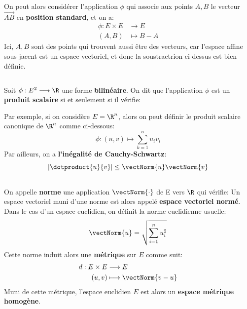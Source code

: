 On peut alors considérer l'application \(\phi\) qui associe aux points \(A, B\) le vecteur \(\overrightarrow{AB}\) en \textbf{position standard}, et on a:
\[
   \begin{aligned}
      \phi: E \times E &\longrightarrow E\\
      (A, B) &\longmapsto B - A
   \end{aligned}
\]
Ici, \(A, B\) sont des points qui trouvent aussi être des vecteurs, car l'espace affine sous-jacent est un espace vectoriel, et donc la soustractrion ci-dessus est bien définie.


\subsection*{}
Soit \(\phi : E^2 \longrightarrow \R\) une forme \textbf{bilinéaire}. On dit que l'application \(\phi\) est un \textbf{produit scalaire} si et seulement si il vérifie:


Par exemple, si on considère \(E = \R^n\), alors on peut définir le produit scalaire canonique de \(\R^n\) comme ci-dessous:
\[
   \phi : (u, v) \longmapsto \sum_{k=1}^{n} u_iv_i 
\]
Par ailleurs, on a \textbf{l'inégalité de Cauchy-Schwartz}:
\[
    |\dotproduct{u}{v}| \leq \vectNorm{u} \vectNorm{v}
\]

\subsection*{}
On appelle \textbf{norme} une application \(\vectNorm{\cdot}\) de E vers \(\R\) qui vérifie:
Un espace vectoriel muni d'une norme est alors appelé \textbf{espace vectoriel normé}. Dans le cas d'un espace euclidien, on définit la norme euclidienne usuelle:
\[
   \vectNorm{u} = \sqrt{\sum_{i=1}^n u_i^2}
\]
Cette norme induit alors une \textbf{métrique} sur \(E\)  comme suit:
\[
   \begin{aligned}
      d: E \times E &\longrightarrow E\\
      (u, v) &\longmapsto \vectNorm{v - u}
   \end{aligned}
\]
Muni de cette métrique, l'espace euclidien \(E\) est alors un \textbf{espace métrique homogène}.

